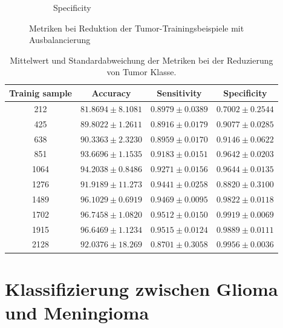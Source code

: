 \begin{figure}[H]
\begin{subfigure}[b]{0.48\textwidth}
    \caption{Specificity}
    \label{fig:reduzierung_tu_specificity}
  \end{subfigure}
  \caption{Metriken bei Reduktion der Tumor-Trainingsbeispiele mit Ausbalancierung}
  \label{fig:reduzierung_tumorsamples}
\end{figure}

\begin{table}[H]
    \centering
        \begin{tabular}{cccc}
            \toprule
            Trainig sample & Accuracy & Sensitivity & Specificity\\
            \midrule
            212  & $81.8694 \pm 8.1081$ & $0.8979 \pm 0.0389$ & $0.7002 \pm 0.2544$\\
            425  & $89.8022 \pm 1.2611$ & $0.8916 \pm 0.0179$ & $0.9077 \pm 0.0285$\\
            638  & $90.3363 \pm 2.3230$ & $0.8959 \pm 0.0170$ & $0.9146 \pm 0.0622$\\
            851  & $93.6696 \pm 1.1535$ & $0.9183 \pm 0.0151$ & $0.9642 \pm 0.0203$\\
            1064 & $94.2038 \pm 0.8486$ & $0.9271 \pm 0.0156$ & $0.9644 \pm 0.0135$\\
            1276 & $91.9189 \pm 11.273$ & $0.9441 \pm 0.0258$ & $0.8820 \pm 0.3100$\\
            1489 & $96.1029 \pm 0.6919$ & $0.9469 \pm 0.0095$ & $0.9822 \pm 0.0118$\\
            1702 & $96.7458 \pm 1.0820$ & $0.9512 \pm 0.0150$ & $0.9919 \pm 0.0069$\\
            1915 & $96.6469 \pm 1.1234$ & $0.9515 \pm 0.0124$ & $0.9889 \pm 0.0111$\\
            2128 & $92.0376 \pm 18.269$ & $0.8701 \pm 0.3058$ & $0.9956 \pm 0.0036$\\
            \bottomrule
        \end{tabular}
  \caption{Mittelwert und Standardabweichung der Metriken bei der Reduzierung von Tumor Klasse.}
  \label{tab:}
\end{table}

\section{Klassifizierung zwischen Glioma und Meningioma}

